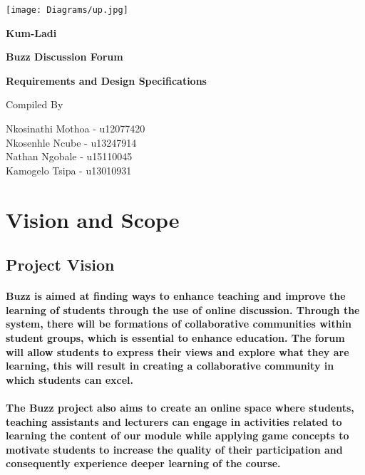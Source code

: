 \documentclass[12pt]{article}
\begin{document}
\begin{titlepage}
\begin{center}
\texttt{[image: Diagrams/up.jpg]}
\bigskip
\bigskip
\bigskip
\begin{huge}
\textbf{Kum-Ladi}
	
\bigskip
\bigskip
\bigskip
\textbf{Buzz Discussion Forum}
\bigskip
\bigskip
\bigskip
\end{huge}

 \begin{huge}
 \textbf{Requirements and Design Specifications}
\end{huge}

\bigskip
\bigskip
\bigskip

Compiled By \\[\baselineskip]
{\large

Nkosinathi Mothoa - u12077420\\
Nkosenhle Ncube - u13247914\\
Nathan Ngobale - u15110045\\
Kamogelo Tsipa - u13010931\\
\par}

\end{center}

\end{titlepage}

\newpage
\tableofcontents

\newpage
\section{Vision and Scope}    

\subsection{Project Vision} 

\paragraph{Buzz is aimed at finding ways to enhance teaching and improve the learning of students through the use of online discussion. Through the system, there will be formations of collaborative communities within student groups, which is essential to enhance education. The forum will allow students to express their views and explore what they are learning, this will result in creating a collaborative community in which students can excel.}
\paragraph{The Buzz project also aims to create an online space where students, teaching assistants and lecturers can engage in activities related to learning the content of our module while applying game concepts to motivate students to increase the quality of their participation and consequently experience deeper learning of the course.}
\end{document}

